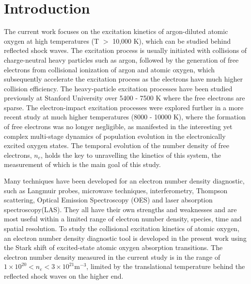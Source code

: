 \documentclass[12pt]{iopart}
\begin{document}
\section{Introduction}
The current work focuses on the excitation kinetics of argon-diluted atomic oxygen at high temperatures (T $>$ 10,000 K), which can be studied behind reflected shock waves. The excitation process is usually initiated with collisions of charge-neutral heavy particles such as argon, followed by the generation of free electrons from collisional ionization of argon and atomic oxygen, which subsequently accelerate the excitation process as the electrons have much higher collision efficiency. The heavy-particle excitation processes have been studied previously at Stanford University\cite{Nations2016} over 5400 - 7500 K where the free electrons are sparse. The electron-impact excitation processes were explored further in a more recent study\cite{Li2019_modeling} at much higher temperatures (8000 - 10000 K), where the formation of free electrons was no longer negligible, as manifested in the interesting yet complex multi-stage dynamics of population evolution in the electronically excited oxygen states. The temporal evolution of the number density of free electrons, $n_e$, holds the key to unravelling the kinetics of this system, the measurement of which is the main goal of this study. 

Many techniques have been developed for an electron number density diagnostic, such as Langmuir probes\cite{Griem1964}, microwave techniques\cite{jahn_1962_microwave,Schneider2005}, interferometry\cite{becker2005_nonequilibrium_air}, Thompson scattering\cite{engeln_2020}, Optical Emission Spectroscopy (OES)\cite{Laux2003,Konjevic2012} and laser absorption spectroscopy(LAS)\cite{Baer1992c,baer1992d, Baer1993_semiconductor}. They all have their own strengths and weaknesses and are most useful within a limited range of electron number density, species, time and spatial resolution. To study the collisional excitation kinetics of atomic oxygen, an electron number density diagnostic tool is developed in the present work using the Stark shift of excited-state atomic oxygen absorption transitions. The electron number density measured in the current study is in the range of $1\times10^{20}<n_e<3\times10^{21}$m$^{-3}$, limited by the translational temperature behind the reflected shock waves on the higher end. 
\end{document}
